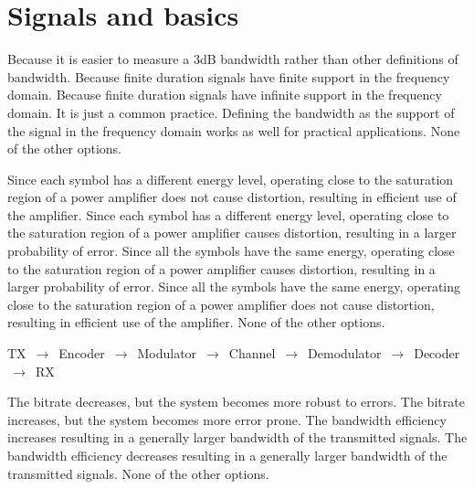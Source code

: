 \section{Signals and basics}


\begin{checkboxes}
    \choice Because it is easier to measure a 3dB bandwidth rather than other definitions of bandwidth.
    \CorrectChoice Because finite duration signals have finite support in the frequency domain.
    \choice Because finite duration signals have infinite support in the frequency domain.
    \choice It is just a common practice. Defining the bandwidth as the support of the signal in the frequency domain works as well for practical
    applications.
    \choice None of the other options.
\end{checkboxes}

\begin{checkboxes}
    \choice Since each symbol has a different energy level, operating close to the saturation region of a power amplifier does not cause distortion, resulting in efficient use of the amplifier.
    \choice Since each symbol has a different energy level, operating close to the saturation region of a power amplifier causes distortion, resulting in a larger probability of error.
    \choice Since all the symbols have the same energy, operating close to the saturation region of a power amplifier causes distortion, resulting in a larger probability of error.
    \CorrectChoice Since all the symbols have the same energy, operating close to the saturation region of a power amplifier does not cause distortion, resulting in efficient use of the amplifier.
    \choice None of the other options.
\end{checkboxes}

\begin{solution}
    TX $\,\to\,$ Encoder $\,\to\,$ Modulator  $\,\to\,$ Channel  $\,\to\,$ Demodulator  $\,\to\,$ Decoder  $\,\to\,$ RX
\end{solution}

\begin{checkboxes}
    \choice The bitrate decreases, but the system becomes more robust to errors.
    \CorrectChoice The bitrate increases, but the system becomes more error prone.
    \choice The bandwidth efficiency increases resulting in a generally larger bandwidth of the transmitted signals.
    \choice The bandwidth efficiency decreases resulting in a generally larger bandwidth of the transmitted signals.
    \choice None of the other options.
\end{checkboxes}

